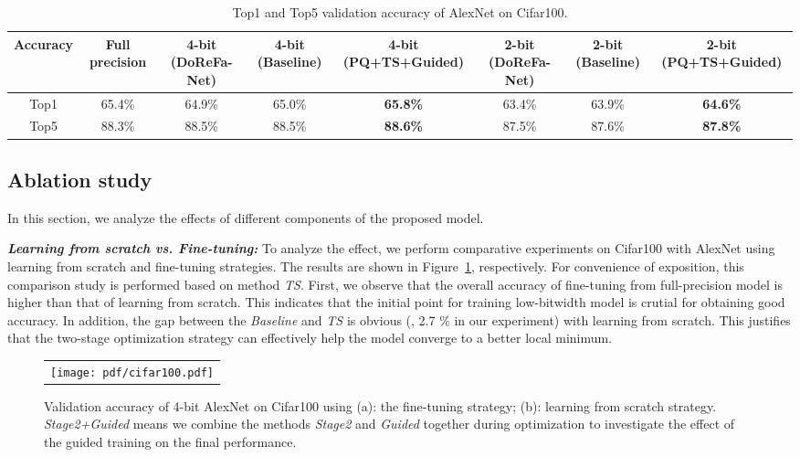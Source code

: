 \begin{table*}[!tbp]
	\centering
	\scalebox{0.76}
	{
		\begin{tabular}{c c |c  c c | c c c}
			\hline
			Accuracy & Full precision &4-bit (DoReFa-Net)  & 4-bit (Baseline) & 4-bit (PQ+TS+Guided) &2-bit (DoReFa-Net) &2-bit (Baseline) &2-bit (PQ+TS+Guided)\\\hline
			Top1 &65.4\%  &64.9\% &65.0\%   &\bf{65.8}\%  &63.4\% &63.9\%  &\bf{64.6}\%  \\
			Top5 &88.3\% &88.5\%  &88.5\%   &\bf{88.6}\% &87.5\%  &87.6\%  &\bf{87.8}\% \\\hline

		\end{tabular}}
		\caption{Top1 and Top5 validation accuracy of AlexNet on Cifar100.}
		\label{tab:cifar100_AlexNet}
	\end{table*}


\subsection{Ablation study} \label{sec:ablation}
In this section, we analyze the effects of different components of the proposed model.

\vspace{1mm}
\noindent\textbf{\emph{Learning from scratch vs. Fine-tuning:}}
To analyze the effect, we perform comparative experiments on Cifar100 with AlexNet using learning from scratch and fine-tuning strategies. The results are shown in Figure~\ref{fig:cifar}, respectively. For convenience of exposition, this comparison study is performed based on method \emph{TS}.
First, we observe that the overall accuracy of fine-tuning from full-precision model is higher than that of learning from scratch. This indicates that the initial point for training low-bitwidth model is crutial for obtaining good accuracy.
In addition, the gap between the \emph{Baseline} and \emph{TS} is obvious (\ie, 2.7 \% in our experiment) with learning from scratch. This justifies that the two-stage optimization strategy can effectively help the model converge to a better local minimum.
\begin{figure}
	\centering
	\resizebox{0.9\linewidth}{!}
	{
		\begin{tabular}{c}
			\texttt{[image: pdf/cifar100.pdf]}
		\end{tabular}
	}
	\caption{Validation accuracy of 4-bit AlexNet on Cifar100 using (a): the fine-tuning strategy; (b): learning from scratch strategy. \emph{Stage2+Guided} means we combine the methods \emph{Stage2} and \emph{Guided} together during optimization to investigate the effect of the guided training on the final performance.}
	\label{fig:cifar}
\end{figure}


